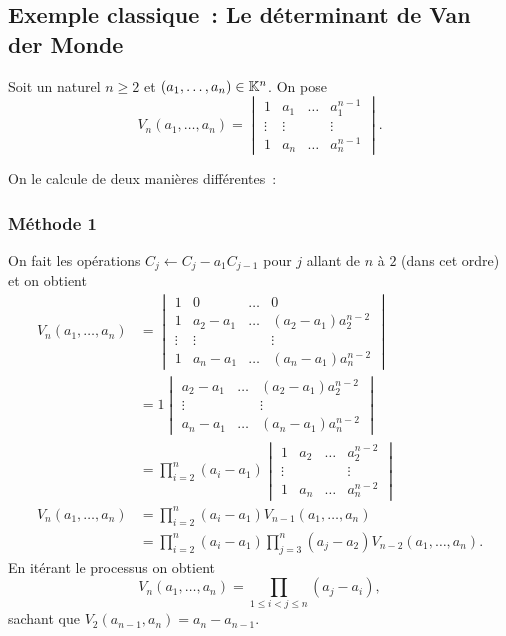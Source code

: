 \subsection{Exemple classique~: Le déterminant de Van der Monde}

Soit un naturel $n \geqslant 2$ et $(a_1, \ldots, a_n) \in \mathbb{K}^n$. On pose
\begin{equation}
  V_n(a_1, \ldots, a_n) =
  \begin{vmatrix}
    1 & a_1 & \ldots & a_1^{n-1} \\
    \vdots & \vdots &  & \vdots \\
    1 & a_n & \ldots & a_n^{n-1}
  \end{vmatrix}.
\end{equation}

On le calcule de deux manières différentes~:

\subsubsection{Méthode 1}

On fait les opérations $ C_j \leftarrow C_j - a_1C_{j-1}$ pour $j$ allant de $n$ à $2$ (dans cet ordre) et on obtient
\begin{align}
V_n(a_1, \ldots, a_n) &=
  \begin{vmatrix}
    1 & 0 & \ldots & 0 \\
    1 & a_2-a_1 & \ldots & (a_2-a_1)a_2^{n-2} \\
    \vdots & \vdots &  & \vdots \\
    1 & a_n-a_1 & \ldots & (a_n-a_1)a_n^{n-2}
  \end{vmatrix}\\
  &=1
  \begin{vmatrix}
    a_2-a_1 & \ldots & (a_2-a_1)a_2^{n-2} \\
    \vdots &  & \vdots \\
    a_n-a_1 & \ldots & (a_n-a_1)a_n^{n-2}
  \end{vmatrix}\\
  &=\prod_{i=2}^n(a_i-a_1)
  \begin{vmatrix}
    1 & a_2 &\ldots & a_2^{n-2} \\
    \vdots & & & \vdots \\
    1 & a_n &\ldots & a_n^{n-2}
  \end{vmatrix}\\
V_n(a_1, \ldots, a_n)  &=\prod_{i=2}^n(a_i-a_1) V_{n-1}(a_1, \ldots, a_n) \\
&=\prod_{i=2}^n(a_i-a_1) \prod_{j=3}^n(a_j-a_2) V_{n-2}(a_1, \ldots, a_n).
\end{align}
En itérant le processus on obtient
\begin{equation}
  V_n(a_1, \ldots, a_n) = \prod_{1 \le i < j \leqslant n} (a_j-a_i),
\end{equation}
sachant que $V_2(a_{n-1},a_n)=a_n-a_{n-1}$.

